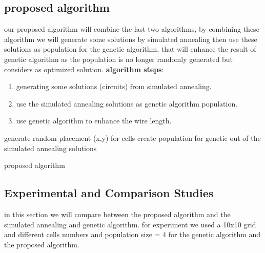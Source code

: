 \documentclass[conference]{IEEEtran}
\begin{document}
\subsection{proposed algorithm}
our proposed algorithm will combine the last two algorithms, by combining these algorithm we will generate some solutions by simulated annealing then use these solutions as population for the genetic algorithm, that will enhance the result of genetic algorithm as the population is no longer randomly generated but considers as optimized solution.
\newline
\newline
\textbf{algorithm steps}:
\begin{enumerate} 
\item generating some solutions (circuits) from simulated annealing.

\item use the simulated annealing solutions as genetic algorithm population.

\item use genetic algorithm to enhance the wire length.

\end{enumerate}

\begin{algorithm}
\SetAlgoLined
{}
 generate random placement (x,y) for cells\;
 create population for genetic out of the simulated annealing solutions\;
 \caption{proposed algorithm}
\end{algorithm}
\subsection{Experimental and Comparison Studies}
in this section we will compare between the proposed algorithm and the simulated annealing and genetic algorithm.
for experiment we used a 10x10 grid and different cells numbers and population size = 4 for the genetic algorithm and the proposed algorithm.
\end{document}
